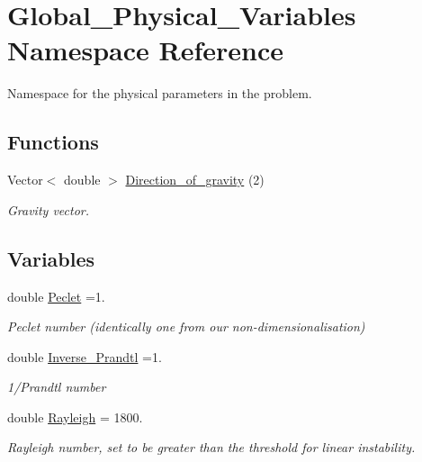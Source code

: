 \hypertarget{namespaceGlobal__Physical__Variables}{}\section{Global\+\_\+\+Physical\+\_\+\+Variables Namespace Reference}
\label{namespaceGlobal__Physical__Variables}


Namespace for the physical parameters in the problem.  


\subsection*{Functions}
\begin{DoxyCompactItemize}
\item 
Vector$<$ double $>$ \hyperlink{namespaceGlobal__Physical__Variables_a42f4a0aee37dbb36186267931c614053}{Direction\+\_\+of\+\_\+gravity} (2)
\begin{DoxyCompactList}\small\item\em Gravity vector. \end{DoxyCompactList}\end{DoxyCompactItemize}
\subsection*{Variables}
\begin{DoxyCompactItemize}
\item 
double \hyperlink{namespaceGlobal__Physical__Variables_ad4cdf142ba50635d62ac4c614f445af7}{Peclet} =1.
\begin{DoxyCompactList}\small\item\em Peclet number (identically one from our non-\/dimensionalisation) \end{DoxyCompactList}\item 
double \hyperlink{namespaceGlobal__Physical__Variables_a87796c9f402e6f90c07cf5ba0db4367e}{Inverse\+\_\+\+Prandtl} =1.
\begin{DoxyCompactList}\small\item\em 1/\+Prandtl number \end{DoxyCompactList}\item 
double \hyperlink{namespaceGlobal__Physical__Variables_a637fd2a6a7c5b34ed3288300d8bf84b7}{Rayleigh} = 1800.
\begin{DoxyCompactList}\small\item\em Rayleigh number, set to be greater than the threshold for linear instability. \end{DoxyCompactList}\end{DoxyCompactItemize}


